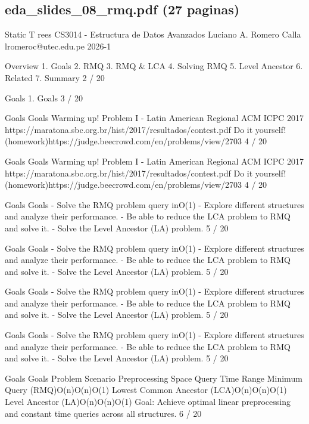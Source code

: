 \subsection*{eda\_slides\_08\_rmq.pdf (27 paginas)}
\begin{description}[leftmargin=!,labelwidth=4.2em,style=nextline]
\item[Pag. 1] Static T rees CS3014 - Estructura de Datos Avanzados Luciano A. Romero Calla lromeroc@utec.edu.pe 2026-1
\item[Pag. 2] Overview 1. Goals 2. RMQ 3. RMQ \& LCA 4. Solving RMQ 5. Level Ancestor 6. Related 7. Summary 2 / 20
\item[Pag. 3] Goals 1. Goals 3 / 20
\item[Pag. 4] Goals Goals Warming up! Problem I - Latin American Regional ACM ICPC 2017 https://maratona.sbc.org.br/hist/2017/resultados/contest.pdf Do it yourself! (homework)https://judge.beecrowd.com/en/problems/view/2703 4 / 20
\item[Pag. 5] Goals Goals Warming up! Problem I - Latin American Regional ACM ICPC 2017 https://maratona.sbc.org.br/hist/2017/resultados/contest.pdf Do it yourself! (homework)https://judge.beecrowd.com/en/problems/view/2703 4 / 20
\item[Pag. 6] Goals Goals - Solve the RMQ problem query inO(1) - Explore different structures and analyze their performance. - Be able to reduce the LCA problem to RMQ and solve it. - Solve the Level Ancestor (LA) problem. 5 / 20
\item[Pag. 7] Goals Goals - Solve the RMQ problem query inO(1) - Explore different structures and analyze their performance. - Be able to reduce the LCA problem to RMQ and solve it. - Solve the Level Ancestor (LA) problem. 5 / 20
\item[Pag. 8] Goals Goals - Solve the RMQ problem query inO(1) - Explore different structures and analyze their performance. - Be able to reduce the LCA problem to RMQ and solve it. - Solve the Level Ancestor (LA) problem. 5 / 20
\item[Pag. 9] Goals Goals - Solve the RMQ problem query inO(1) - Explore different structures and analyze their performance. - Be able to reduce the LCA problem to RMQ and solve it. - Solve the Level Ancestor (LA) problem. 5 / 20
\item[Pag. 10] Goals Goals Problem Scenario Preprocessing Space Query Time Range Minimum Query (RMQ)O(n)O(n)O(1) Lowest Common Ancestor (LCA)O(n)O(n)O(1) Level Ancestor (LA)O(n)O(n)O(1) Goal: Achieve optimal linear preprocessing and constant time queries across all structures. 6 / 20

\end{description}
